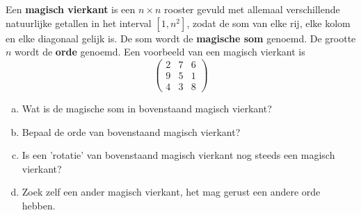 \documentclass[12pt,twoside]{article}
\begin{document}
\begin{oefening}
  Een {\bf magisch vierkant} is een $n \times n$ rooster gevuld met allemaal verschillende natuurlijke getallen in het interval $[1,n^2]$, zodat de som van elke rij, elke kolom en elke diagonaal gelijk is. De som wordt de {\bf magische som} genoemd. De grootte $n$ wordt de {\bf orde} genoemd. Een voorbeeld van een magisch vierkant is
  $$
  \begin{pmatrix}
    2 & 7 & 6\\
    9 & 5 & 1\\
    4 & 3 & 8
  \end{pmatrix}
  $$
  \begin{enumerate}[(a)]
  \item Wat is de magische som in bovenstaand magisch vierkant?
  \item Bepaal de orde van bovenstaand magisch vierkant?
  \item Is een 'rotatie' van bovenstaand magisch vierkant nog steeds een magisch vierkant?
  \item Zoek zelf een ander magisch vierkant, het mag gerust een andere orde hebben.
  \end{enumerate}
\end{oefening}
\end{document}

